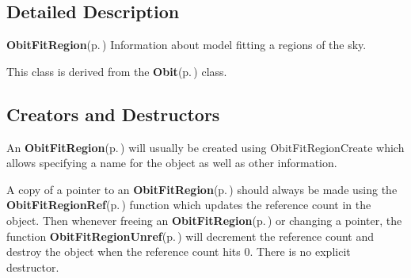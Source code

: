 

\subsection{Detailed Description}
{\bf Obit\-Fit\-Region}{\rm (p.\,\pageref{structObitFitRegion})} Information about model fitting a regions of the sky. 

This class is derived from the {\bf Obit}{\rm (p.\,\pageref{structObit})} class.\subsection{Creators and Destructors}\label{ObitFitRegion_8h_ObitFitRegionaccess}
An {\bf Obit\-Fit\-Region}{\rm (p.\,\pageref{structObitFitRegion})} will usually be created using Obit\-Fit\-Region\-Create which allows specifying a name for the object as well as other information.

A copy of a pointer to an {\bf Obit\-Fit\-Region}{\rm (p.\,\pageref{structObitFitRegion})} should always be made using the {\bf Obit\-Fit\-Region\-Ref}{\rm (p.\,\pageref{ObitFitRegion_8h_a1})} function which updates the reference count in the object. Then whenever freeing an {\bf Obit\-Fit\-Region}{\rm (p.\,\pageref{structObitFitRegion})} or changing a pointer, the function {\bf Obit\-Fit\-Region\-Unref}{\rm (p.\,\pageref{ObitFitRegion_8h_a0})} will decrement the reference count and destroy the object when the reference count hits 0. There is no explicit destructor.

